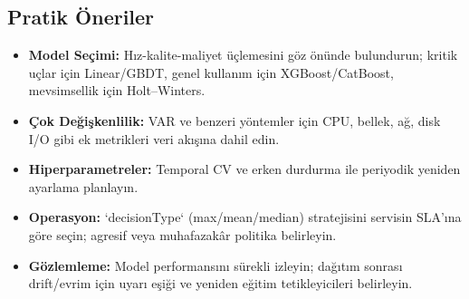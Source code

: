 \subsection{Pratik Öneriler}

\begin{itemize}[noitemsep]
  \item \textbf{Model Seçimi:} Hız-kalite-maliyet üçlemesini göz önünde bulundurun; kritik uçlar için Linear/GBDT, genel kullanım için XGBoost/CatBoost, mevsimsellik için Holt–Winters.
  \item \textbf{Çok Değişkenlilik:} VAR ve benzeri yöntemler için CPU, bellek, ağ, disk I/O gibi ek metrikleri veri akışına dahil edin.
  \item \textbf{Hiperparametreler:} Temporal CV ve erken durdurma ile periyodik yeniden ayarlama planlayın.
  \item \textbf{Operasyon:} `decisionType` (max/mean/median) stratejisini servisin SLA’ına göre seçin; agresif veya muhafazakâr politika belirleyin.
  \item \textbf{Gözlemleme:} Model performansını sürekli izleyin; dağıtım sonrası drift/evrim için uyarı eşiği ve yeniden eğitim tetikleyicileri belirleyin.
\end{itemize}
